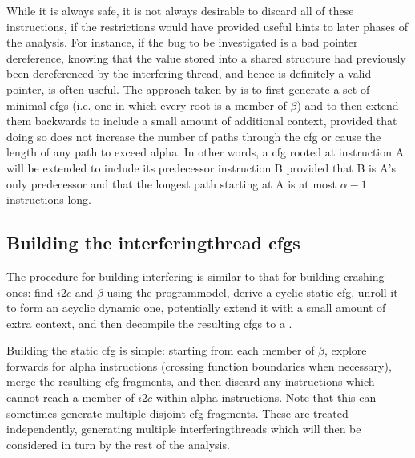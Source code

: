 While it is always safe, it is not always desirable to discard all of
these instructions, if the restrictions would have provided useful
hints to later phases of the analysis.  For instance, if the bug to be
investigated is a bad pointer dereference, knowing that the value
stored into a shared structure had previously been dereferenced by the
interfering thread, and hence is definitely a valid pointer, is often
useful.  The approach taken by {\implementation} is to first generate
a set of minimal \glspl{cfg} (i.e. one in which every root is a member
of $\beta$) and to then extend them backwards to include a small
amount of additional context, provided that doing so does not increase
the number of paths through the \gls{cfg} or cause the length of any
path to exceed \gls{alpha}.  In other words, a \gls{cfg} rooted at
instruction A will be extended to include its predecessor instruction
B provided that B is A's only predecessor and that the longest path
starting at A is at most $\alpha - 1$ instructions long.

\subsection[Building the \glsentrytext{interferingthread} \glsentrytext{cfg}s]{Building the \gls{interferingthread} \glspl{cfg}}

The procedure for building interfering {\StateMachines} is similar to
that for building crashing ones: find $i2c$ and $\beta$ using the
\gls{programmodel}, derive a cyclic static \gls{cfg}, unroll it to
form an acyclic dynamic one, potentially extend it with a small amount
of extra context, and then decompile the resulting \glspl{cfg} to a
{\StateMachine}.

Building the static \gls{cfg} is simple: starting from each member of
$\beta$, explore forwards for \gls{alpha} instructions (crossing
function boundaries when necessary), merge the resulting \gls{cfg}
fragments, and then discard any instructions which cannot reach a
member of $i2c$ within \gls{alpha} instructions.  Note that this can
sometimes generate multiple disjoint \gls{cfg} fragments.  These are
treated independently, generating multiple \glspl{interferingthread}
which will then be considered in turn by the rest of the analysis.

